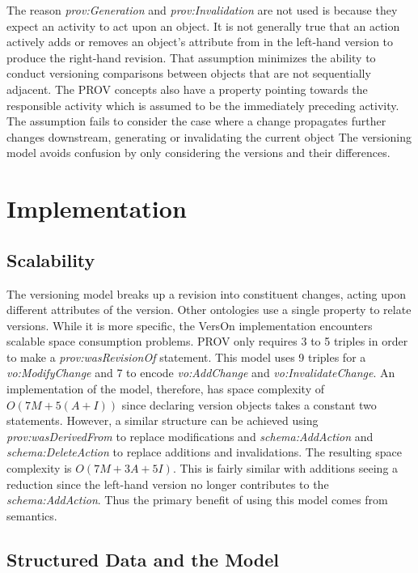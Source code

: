 The reason \textit{prov:Generation} and \textit{prov:Invalidation} are not used is because they expect an activity to act upon an object.
It is not generally true that an action actively adds or removes an object's attribute from in the left-hand version to produce the right-hand revision.
That assumption minimizes the ability to conduct versioning comparisons between objects that are not sequentially adjacent.
The PROV concepts also have a property pointing towards the responsible activity which is assumed to be the immediately preceding activity.
The assumption fails to consider the case where a change propagates further changes downstream, generating or invalidating the current object
The versioning model avoids confusion by only considering the versions and their differences.

\section{Implementation}

\subsection{Scalability}

The versioning model breaks up a revision into constituent changes, acting upon different attributes of the version.
Other ontologies use a single property to relate versions.
While it is more specific, the VersOn implementation encounters scalable space consumption problems.
PROV only requires 3 to 5 triples in order to make a \textit{prov:wasRevisionOf} statement.
This model uses 9 triples for a \textit{vo:ModifyChange} and 7 to encode \textit{vo:AddChange} and \textit{vo:InvalidateChange}.
An implementation of the model, therefore, has space complexity of \(O(7M+5(A+I))\) since declaring version objects takes a constant two statements.
However, a similar structure can be achieved using \textit{prov:wasDerivedFrom} to replace modifications and \textit{schema:AddAction} and \textit{schema:DeleteAction} to replace additions and invalidations.
The resulting space complexity is \(O(7M+3A+5I)\).
This is fairly similar with additions seeing a reduction since the left-hand version no longer contributes to the \textit{schema:AddAction}.
Thus the primary benefit of using this model comes from semantics.

\subsection{Structured Data and the Model}

